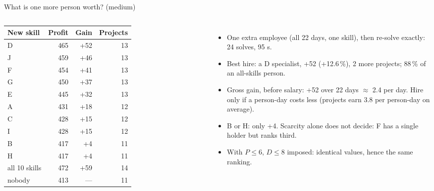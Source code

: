 \documentclass[aspectratio=169,11pt]{beamer}
\begin{document}
\begin{frame}{What is one more person worth? (medium)}
\begin{columns}[T]
\centering\footnotesize
\begin{tabular}{lrrr}
\toprule
New skill & Profit & Gain & Projects\\
\midrule
D & 465 & \alert{+52} & 13\\
J & 459 & +46 & 13\\
F & 454 & +41 & 13\\
G & 450 & +37 & 13\\
E & 445 & +32 & 13\\
A & 431 & +18 & 12\\
C & 428 & +15 & 12\\
I & 428 & +15 & 12\\
B & 417 & +4 & 11\\
H & 417 & +4 & 11\\
\midrule
all 10 skills & 472 & +59 & 14\\
nobody & 413 & --- & 11\\
\bottomrule
\end{tabular}
\small
\begin{itemize}\setlength{\itemsep}{0.35em}
  \item One extra employee (all 22 days, one skill), then \alert{re-solve exactly}: 24 solves, 95 s.
  \item Best hire: a \alert{D specialist}, +52 (+12.6\,\%), 2 more projects; 88\,\% of an all-skills person.
  \item \alert{Gross gain, before salary:} +52 over 22 days $\approx$ 2.4 per day. Hire only if a person-day costs less (projects earn 3.8 per person-day on average).
  \item B or H: only +4. Scarcity alone does not decide: F has a single holder but ranks third.
  \item With $P\le6$, $D\le8$ imposed: \alert{identical values}, hence the same ranking.
\end{itemize}
\end{columns}
\end{frame}
\end{document}

